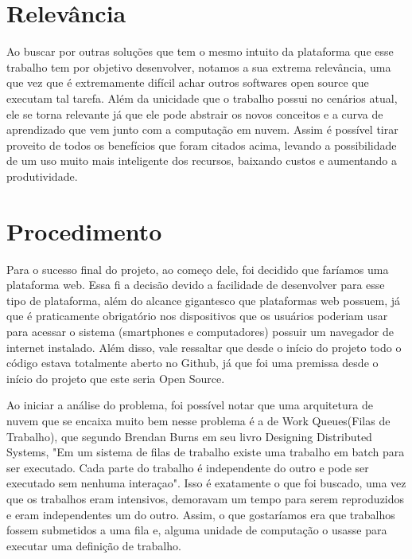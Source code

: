 \documentclass[11pt,twoside]{article}
\begin{document}
\section{Relevância}
Ao buscar por outras soluções que tem o mesmo intuito da plataforma que esse trabalho tem por objetivo desenvolver, notamos a sua extrema relevância, uma que vez que é extremamente difícil achar outros softwares
open source que executam tal tarefa.
Além da unicidade que o trabalho possui no cenários atual, ele se torna relevante já que ele pode abstrair os novos conceitos e a curva de aprendizado que vem junto com a computação em nuvem. Assim é possível
tirar proveito de todos os benefícios que foram citados acima, levando a possibilidade de um uso muito mais inteligente dos recursos, baixando custos e aumentando a produtividade.

\section{Procedimento}
Para o sucesso final do projeto, ao começo dele, foi decidido que faríamos uma plataforma web. Essa fi a decisão devido a facilidade de desenvolver para esse tipo de plataforma, além do alcance
gigantesco que plataformas web possuem, já que é praticamente obrigatório nos dispositivos que os usuários poderiam usar para acessar o sistema (smartphones e computadores) possuir um
navegador de internet instalado. Além disso, vale ressaltar que desde o início do projeto todo o código estava totalmente aberto no Github, já que foi uma premissa desde o início do projeto que este
seria Open Source.

Ao iniciar a análise do problema, foi possível notar que uma arquitetura de nuvem que se encaixa muito bem nesse problema é a de Work Queues(Filas de Trabalho), que segundo Brendan Burns em seu livro
Designing Distributed Systems, "Em um sistema de filas de trabalho existe uma trabalho em batch para ser executado. Cada parte do trabalho é independente do outro e pode ser executado sem nenhuma interaçao".
Isso é exatamente o que foi buscado, uma vez que os trabalhos eram intensivos, demoravam um tempo para serem reproduzidos e eram independentes um do outro. Assim, o que gostaríamos era que trabalhos fossem submetidos
a uma fila e, alguma unidade de computação o usasse para executar uma definição de trabalho.
\end{document}
